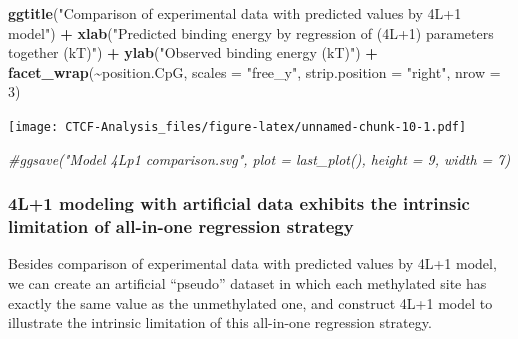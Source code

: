 \documentclass[
]{article}
\newenvironment{Shaded}{\begin{snugshade}}{\end{snugshade}}
\newcommand{\CommentTok}[1]{\textcolor[rgb]{0.56,0.35,0.01}{\textit{#1}}}
\newcommand{\DataTypeTok}[1]{\textcolor[rgb]{0.13,0.29,0.53}{#1}}
\newcommand{\DecValTok}[1]{\textcolor[rgb]{0.00,0.00,0.81}{#1}}
\newcommand{\KeywordTok}[1]{\textcolor[rgb]{0.13,0.29,0.53}{\textbf{#1}}}
\newcommand{\NormalTok}[1]{#1}
\newcommand{\OperatorTok}[1]{\textcolor[rgb]{0.81,0.36,0.00}{\textbf{#1}}}
\newcommand{\StringTok}[1]{\textcolor[rgb]{0.31,0.60,0.02}{#1}}
\begin{document}
\begin{Shaded}
\begin{Highlighting}[]
\StringTok{    }\KeywordTok{ggtitle}\NormalTok{(}\StringTok{"Comparison of experimental data with predicted values by 4L+1 model"}\NormalTok{) }\OperatorTok{+}
\StringTok{    }\KeywordTok{xlab}\NormalTok{(}\StringTok{"Predicted binding energy by regression of (4L+1) parameters together (kT)"}\NormalTok{) }\OperatorTok{+}
\StringTok{    }\KeywordTok{ylab}\NormalTok{(}\StringTok{"Observed binding energy (kT)"}\NormalTok{) }\OperatorTok{+}
\StringTok{    }\KeywordTok{facet\_wrap}\NormalTok{(}\OperatorTok{\textasciitilde{}}\NormalTok{position.CpG, }
               \DataTypeTok{scales =} \StringTok{"free\_y"}\NormalTok{,}
               \DataTypeTok{strip.position =} \StringTok{"right"}\NormalTok{,}
               \DataTypeTok{nrow =} \DecValTok{3}\NormalTok{)}
\end{Highlighting}
\end{Shaded}

\texttt{[image: CTCF-Analysis\_files/figure-latex/unnamed-chunk-10-1.pdf]}

\begin{Shaded}
\begin{Highlighting}[]
\CommentTok{\#ggsave("Model 4Lp1 comparison.svg", plot = last\_plot(), height = 9, width = 7)}
\end{Highlighting}
\end{Shaded}

\hypertarget{l1-modeling-with-artificial-data-exhibits-the-intrinsic-limitation-of-all-in-one-regression-strategy}{%
\subsubsection{4L+1 modeling with artificial data exhibits the intrinsic
limitation of all-in-one regression
strategy}\label{l1-modeling-with-artificial-data-exhibits-the-intrinsic-limitation-of-all-in-one-regression-strategy}}

Besides comparison of experimental data with predicted values by 4L+1
model, we can create an artificial ``pseudo'' dataset in which each
methylated site has exactly the same value as the unmethylated one, and
construct 4L+1 model to illustrate the intrinsic limitation of this
all-in-one regression strategy.
\end{document}
